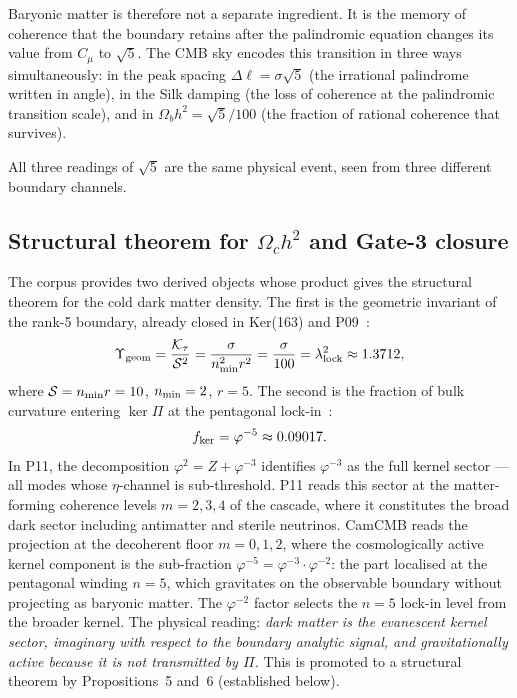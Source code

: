 \documentclass[twocolumn,10pt]{article}
\newcommand{\vp}{\varphi}
\newcommand{\Ktau}{\mathcal{K}_\tau}
\newcommand{\llock}{\lambda_{\rm lock}}
\newcommand{\kerPi}{\ker\Pi}
\begin{document}
Baryonic matter is therefore not a separate ingredient. It is
the memory of coherence that the boundary retains after the
palindromic equation changes its value from $C_\mu$ to $\sqrt{5}$.
The CMB sky encodes this transition in three ways simultaneously:
in the peak spacing $\Delta\ell=\sigma\sqrt{5}$ (the irrational
palindrome written in angle), in the Silk damping (the loss of
coherence at the palindromic transition scale), and in
$\Omega_bh^2=\sqrt{5}/100$ (the fraction of rational coherence
that survives).

All three readings of $\sqrt{5}$ are the same physical event,
seen from three different boundary channels.

\subsection{Structural theorem for $\Omega_ch^2$ and Gate-3 closure}
\label{sec:omega_c}

The corpus provides two derived objects whose product gives the
structural theorem for the cold dark matter density.
The first is the geometric invariant of the rank-5 boundary,
already closed in Ker(163) and P09~\cite{CamKer163,CamP09}:
\begin{equation}
  \Upsilon_{\rm geom} = \frac{\Ktau}{\mathcal{S}^2}
  = \frac{\sigma}{n_{\rm min}^2 r^2}
  = \frac{\sigma}{100} = \llock^2 \approx 1.3712,
  \label{eq:Upsilon}
\end{equation}
where $\mathcal{S}=n_{\rm min} r=10$, $n_{\rm min}=2$, $r=5$.
The second is the fraction of bulk curvature entering $\kerPi$ at the
pentagonal lock-in~\cite{CamP11}:
\begin{equation}
  f_{\rm ker} = \vp^{-5} \approx 0.09017.
  \label{eq:fker}
\end{equation}
In P11, the decomposition $\vp^2=Z+\vp^{-3}$ identifies $\vp^{-3}$ as
the full kernel sector — all modes whose $\eta$-channel is
sub-threshold. P11 reads this sector at the matter-forming coherence
levels $m=2,3,4$ of the cascade, where it constitutes the broad dark
sector including antimatter and sterile neutrinos.
CamCMB reads the projection at the decoherent floor $m=0,1,2$,
where the cosmologically active kernel component is the sub-fraction
$\vp^{-5}=\vp^{-3}\cdot\vp^{-2}$: the part localised at the
pentagonal winding $n=5$, which gravitates on the observable boundary
without projecting as baryonic matter. The $\vp^{-2}$ factor selects
the $n=5$ lock-in level from the broader kernel.
The physical reading:
\textit{dark matter is the evanescent kernel sector, imaginary with
respect to the boundary analytic signal, and gravitationally active
because it is not transmitted by $\Pi$.} This is promoted to a
structural theorem by Propositions~5 and~6 (established below).
\end{document}

